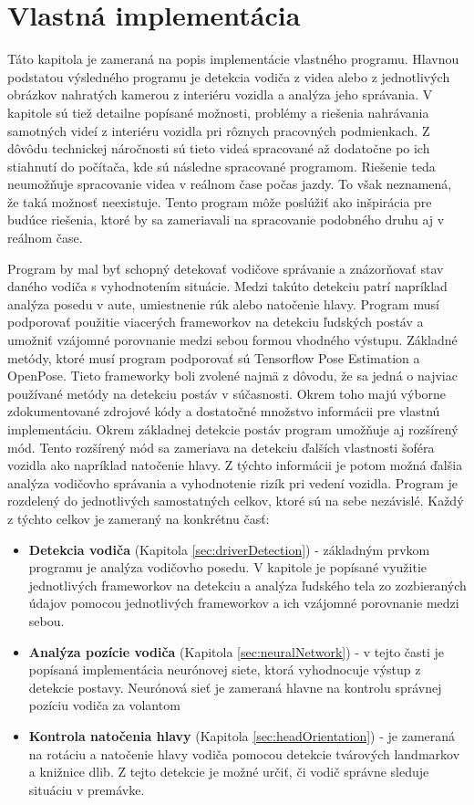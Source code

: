 \documentclass[slovak,master,dept460,male,cpp,cpdeclaration]{diploma}
\begin{document}
\section{Vlastná implementácia}
\label{sec:Vlastná implementácia}
Táto kapitola je zameraná na  popis implementácie vlastného programu. Hlavnou podstatou výsledného programu je detekcia vodiča z videa alebo z jednotlivých obrázkov nahratých kamerou z interiéru vozidla a analýza jeho správania. V kapitole sú tiež detailne popísané možnosti, problémy a riešenia nahrávania samotných videí z interiéru vozidla pri rôznych pracovných podmienkach. Z dôvôdu technickej náročnosti sú tieto videá spracované až dodatočne po ich stiahnutí do počítača, kde sú následne spracované  programom. Riešenie teda neumožňuje spracovanie videa v reálnom čase počas jazdy. To však neznamená, že taká možnosť neexistuje. Tento program môže poslúžiť ako inšpirácia pre budúce riešenia, ktoré by sa zameriavali na spracovanie podobného druhu aj v reálnom čase.\par
Program  by mal byť schopný detekovať vodičove správanie a znázorňovať stav daného vodiča s vyhodnotením situácie. Medzi takúto detekciu patrí napríklad analýza posedu v aute, umiestnenie rúk alebo natočenie hlavy. Program musí podporovať použitie viacerých frameworkov na detekciu ľudských postáv a umožniť vzájomné porovnanie medzi sebou formou vhodného výstupu. Základné metódy, ktoré musí program podporovať sú Tensorflow Pose Estimation a OpenPose. Tieto frameworky boli zvolené najmä z dôvodu, že sa jedná o najviac používané metódy na detekciu postáv v súčasnosti. Okrem toho majú výborne zdokumentované zdrojové kódy a dostatočné množstvo informácii pre vlastnú implementáciu. Okrem základnej detekcie postáv program umožňuje aj rozšírený mód. Tento rozšírený mód sa zameriava na detekciu ďalších vlastnosti šoféra vozidla ako napríklad natočenie hlavy. Z týchto informácii je potom možná ďalšia analýza vodičovho správania a vyhodnotenie rizík pri vedení vozidla. Program je rozdelený do jednotlivých samostatných celkov, ktoré sú na sebe nezávislé. Každý z týchto celkov je zameraný na konkrétnu časť:
\begin{itemize}
\item \textbf{Detekcia vodiča} (Kapitola \ref{sec:driverDetection}) - základným prvkom programu je  analýza vodičovho posedu.  V kapitole je popísané využitie jednotlivých frameworkov na detekciu a analýza ľudského tela zo zozbieraných údajov pomocou jednotlivých frameworkov a ich vzájomné porovnanie medzi sebou.

\item \textbf{Analýza pozície vodiča} (Kapitola \ref{sec:neuralNetwork}) - v tejto  časti je popísaná implementácia neurónovej siete, ktorá vyhodnocuje výstup z detekcie postavy. Neurónová sieť je zameraná hlavne  na kontrolu správnej pozíciu vodiča za volantom

\item \textbf{Kontrola natočenia hlavy} (Kapitola \ref{sec:headOrientation}) - je zameraná na rotáciu a natočenie hlavy vodiča pomocou detekcie tvárových landmarkov a knižnice dlib\cite{dlib09}. Z tejto detekcie je možné určiť, či vodič správne sleduje situáciu v premávke.
\end{itemize}
\end{document}
